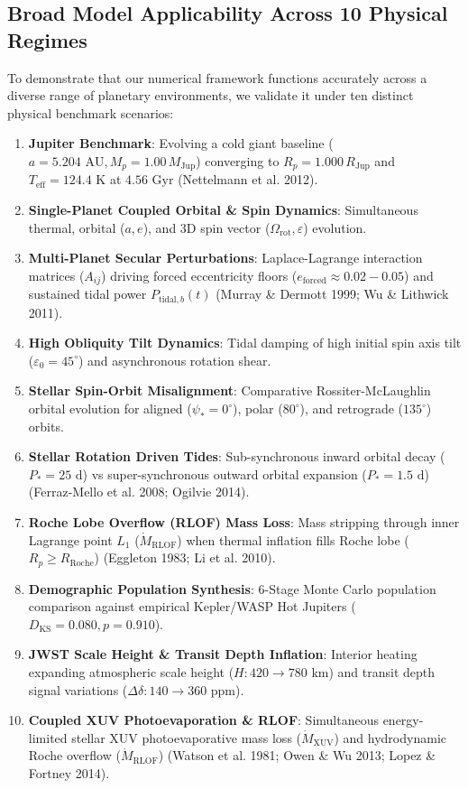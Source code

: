 \subsection{Broad Model Applicability Across 10 Physical Regimes}
To demonstrate that our numerical framework functions accurately across a diverse range of planetary environments, we validate it under ten distinct physical benchmark scenarios:
\begin{enumerate}
    \item \textbf{Jupiter Benchmark}: Evolving a cold giant baseline ($a = 5.204\text{ AU}, M_p = 1.00\,M_{\mathrm{Jup}}$) converging to $R_p = 1.000\,R_{\mathrm{Jup}}$ and $T_{\mathrm{eff}} = 124.4\text{ K}$ at $4.56\text{ Gyr}$ (Nettelmann et al. 2012).
    \item \textbf{Single-Planet Coupled Orbital \& Spin Dynamics}: Simultaneous thermal, orbital ($a, e$), and 3D spin vector ($\Omega_{\mathrm{rot}}, \varepsilon$) evolution.
    \item \textbf{Multi-Planet Secular Perturbations}: Laplace-Lagrange interaction matrices ($A_{ij}$) driving forced eccentricity floors ($e_{\mathrm{forced}} \approx 0.02 - 0.05$) and sustained tidal power $P_{\mathrm{tidal}, b}(t)$ (Murray \& Dermott 1999; Wu \& Lithwick 2011).
    \item \textbf{High Obliquity Tilt Dynamics}: Tidal damping of high initial spin axis tilt ($\varepsilon_0 = 45^\circ$) and asynchronous rotation shear.
    \item \textbf{Stellar Spin-Orbit Misalignment}: Comparative Rossiter-McLaughlin orbital evolution for aligned ($\psi_* = 0^\circ$), polar ($80^\circ$), and retrograde ($135^\circ$) orbits.
    \item \textbf{Stellar Rotation Driven Tides}: Sub-synchronous inward orbital decay ($P_* = 25\text{ d}$) vs super-synchronous outward orbital expansion ($P_* = 1.5\text{ d}$) (Ferraz-Mello et al. 2008; Ogilvie 2014).
    \item \textbf{Roche Lobe Overflow (RLOF) Mass Loss}: Mass stripping through inner Lagrange point $L_1$ ($\dot{M}_{\mathrm{RLOF}}$) when thermal inflation fills Roche lobe ($R_p \ge R_{\mathrm{Roche}}$) (Eggleton 1983; Li et al. 2010).
    \item \textbf{Demographic Population Synthesis}: 6-Stage Monte Carlo population comparison against empirical Kepler/WASP Hot Jupiters ($D_{\mathrm{KS}} = 0.080, p = 0.910$).
    \item \textbf{JWST Scale Height \& Transit Depth Inflation}: Interior heating expanding atmospheric scale height ($H: 420 \to 780\text{ km}$) and transit depth signal variations ($\Delta \delta: 140 \to 360\text{ ppm}$).
    \item \textbf{Coupled XUV Photoevaporation \& RLOF}: Simultaneous energy-limited stellar XUV photoevaporative mass loss ($\dot{M}_{\mathrm{XUV}}$) and hydrodynamic Roche overflow ($\dot{M}_{\mathrm{RLOF}}$) (Watson et al. 1981; Owen \& Wu 2013; Lopez \& Fortney 2014).
\end{enumerate}

